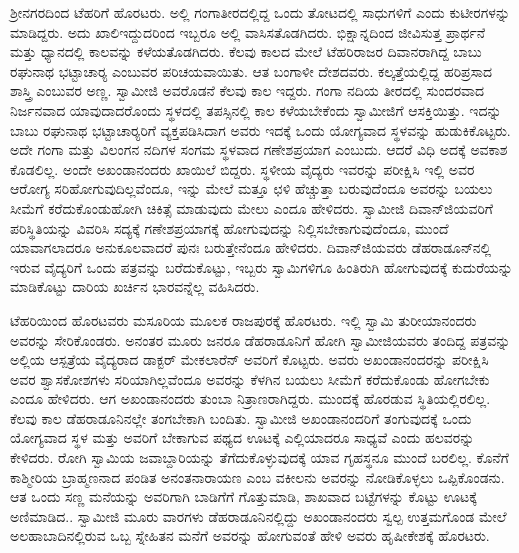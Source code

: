ಶ‍್ರೀನಗರದಿಂದ ಟೆಹರಿಗೆ ಹೊರಟರು. ಅಲ್ಲಿ ಗಂಗಾತೀರದಲ್ಲಿದ್ದ ಒಂದು ತೋಟದಲ್ಲಿ ಸಾಧುಗಳಿಗೆ ಎಂದು ಕುಟೀರಗಳನ್ನು ಮಾಡಿದ್ದರು. ಅದು ಖಾಲಿ\break ಇದ್ದುದರಿಂದ ಇಬ್ಬರೂ ಅಲ್ಲಿ ವಾಸಿಸತೊಡಗಿದರು. ಭಿಕ್ಷಾನ್ನದಿಂದ ಜೀವಿಸುತ್ತ ಪ್ರಾರ್ಥನೆ ಮತ್ತು ಧ್ಯಾನದಲ್ಲಿ ಕಾಲವನ್ನು ಕಳೆಯತೊಡಗಿದರು. ಕೆಲವು ಕಾಲದ ಮೇಲೆ ಟೆಹರಿರಾಜರ ದಿವಾನರಾಗಿದ್ದ ಬಾಬು ರಘುನಾಥ ಭಟ್ಟಾಚಾರ‍್ಯ ಎಂಬುವರ ಪರಿಚಯವಾಯಿತು. ಆತ ಬಂಗಾಳೀ ದೇಶದವರು. ಕಲ್ಕತ್ತೆಯಲ್ಲಿದ್ದ ಹರಿಪ್ರಸಾದ ಶಾಸ್ತ್ರಿ ಎಂಬುವರ ಅಣ್ಣ. ಸ್ವಾಮೀಜಿ ಅವರೊಡನೆ ಕೆಲವು ಕಾಲ ಇದ್ದರು. ಗಂಗಾ ನದಿಯ ತೀರದಲ್ಲಿ ಸುಂದರವಾದ ನಿರ್ಜನವಾದ ಯಾವುದಾದರೊಂದು ಸ್ಥಳದಲ್ಲಿ ತಪಸ್ಸಿನಲ್ಲಿ ಕಾಲ ಕಳೆಯಬೇಕೆಂದು ಸ್ವಾಮೀಜಿಗೆ ಆಸಕ್ತಿಯಿತ್ತು. ಇದನ್ನು ಬಾಬು ರಘುನಾಥ ಭಟ್ಟಾಚಾರ‍್ಯರಿಗೆ ವ್ಯಕ್ತಪಡಿಸಿದಾಗ ಅವರು ಇದಕ್ಕೆ ಒಂದು ಯೋಗ್ಯವಾದ ಸ್ಥಳವನ್ನು ಹುಡುಕಿಕೊಟ್ಟರು. ಅದೇ ಗಂಗಾ ಮತ್ತು ವಿಲಂಗನ ನದಿಗಳ ಸಂಗಮ ಸ್ಥಳವಾದ ಗಣೇಶಪ್ರಯಾಗ ಎಂಬುದು. ಆದರೆ ವಿಧಿ ಅದಕ್ಕೆ ಅವಕಾಶ ಕೊಡಲಿಲ್ಲ. ಅಂದೇ ಅಖಂಡಾನಂದರು ಖಾಯಿಲೆ ಬಿದ್ದರು. ಸ್ಥಳೀಯ ವೈದ್ಯರು ಇವರನ್ನು ಪರೀಕ್ಷಿಸಿ ಇಲ್ಲಿ ಅವರ ಆರೋಗ್ಯ ಸರಿಹೋಗುವುದಿಲ್ಲವೆಂದೂ, ಇನ್ನು ಮೇಲೆ ಮತ್ತೂ ಛಳಿ ಹೆಚ್ಚುತ್ತಾ ಬರುವುದೆಂದೂ ಅವರನ್ನು ಬಯಲು ಸೀಮೆಗೆ ಕರೆದುಕೊಂಡುಹೋಗಿ ಚಿಕಿತ್ಸೆ ಮಾಡುವುದು ಮೇಲು ಎಂದೂ ಹೇಳಿದರು. ಸ್ವಾಮೀಜಿ ದಿವಾನ್‍ಜಿಯವರಿಗೆ ಪರಿಸ್ಥಿತಿಯನ್ನು ವಿವರಿಸಿ ಸದ್ಯಕ್ಕೆ ಗಣೇಶಪ್ರಯಾಗಕ್ಕೆ ಹೋಗುವುದನ್ನು ನಿಲ್ಲಿಸಬೇಕಾಗುವುದೆಂದೂ, ಮುಂದೆ ಯಾವಾಗಲಾದರೂ ಅನುಕೂಲವಾದರೆ ಪುನಃ ಬರುತ್ತೇನೆಂದೂ ಹೇಳಿದರು. ದಿವಾನ್‍ಜಿಯವರು ಡೆಹರಾಡೂನ್‍ನಲ್ಲಿ ಇರುವ ವೈದ್ಯರಿಗೆ ಒಂದು ಪತ್ರವನ್ನು ಬರೆದುಕೊಟ್ಟು, ಇಬ್ಬರು ಸ್ವಾಮಿಗಳಿಗೂ ಹಿಂತಿರುಗಿ ಹೋಗುವುದಕ್ಕೆ ಕುದುರೆಯನ್ನು ಮಾಡಿಕೊಟ್ಟು ದಾರಿಯ ಖರ್ಚಿನ ಭಾರವನ್ನೆಲ್ಲ ವಹಿಸಿದರು. 

ಟೆಹರಿಯಿಂದ ಹೊರಟವರು ಮಸೂರಿಯ ಮೂಲಕ ರಾಜಪುರಕ್ಕೆ ಹೊರಟರು. ಇಲ್ಲಿ ಸ್ವಾಮಿ ತುರೀಯಾನಂದರು ಅವರನ್ನು ಸೇರಿಕೊಂಡರು. ಅನಂತರ ಮೂರು ಜನರೂ ಡೆಹರಾಡೂನಿಗೆ ಹೋಗಿ ಸ್ವಾಮೀಜಿಯವರು ತಂದಿದ್ದ ಪತ್ರವನ್ನು ಅಲ್ಲಿಯ ಆಸ್ಪತ್ರೆಯ ವೈದ್ಯರಾದ ಡಾಕ್ಟರ್ ಮೇಕಲಾರೆನ್ ಅವರಿಗೆ ಕೊಟ್ಟರು. ಅವರು ಅಖಂಡಾನಂದರನ್ನು ಪರೀಕ್ಷಿಸಿ ಅವರ ಶ್ವಾಸಕೋಶಗಳು ಸರಿಯಾಗಿಲ್ಲವೆಂದೂ ಅವರನ್ನು ಕೆಳಗಿನ ಬಯಲು ಸೀಮೆಗೆ ಕರೆದುಕೊಂಡು ಹೋಗಬೇಕು ಎಂದೂ ಹೇಳಿದರು. ಆಗ ಅಖಂಡಾನಂದರು ತುಂಬಾ ನಿತ್ರಾಣರಾಗಿದ್ದರು. ಮುಂದಕ್ಕೆ ಹೊರಡುವ ಸ್ಥಿತಿಯಲ್ಲಿರಲಿಲ್ಲ. ಕೆಲವು ಕಾಲ ಡೆಹರಾಡೂನಿನಲ್ಲೇ ತಂಗಬೇಕಾಗಿ ಬಂದಿತು. ಸ್ವಾಮೀಜಿ ಅಖಂಡಾನಂದರಿಗೆ ತಂಗುವುದಕ್ಕೆ ಒಂದು ಯೋಗ್ಯವಾದ ಸ್ಥಳ ಮತ್ತು ಅವರಿಗೆ ಬೇಕಾಗುವ ಪಥ್ಯದ ಊಟಕ್ಕೆ ಎಲ್ಲಿಯಾದರೂ ಸಾಧ್ಯವೆ ಎಂದು ಹಲವರನ್ನು ಕೇಳಿದರು. ರೋಗಿ ಸ್ವಾಮಿಯ ಜವಾಬ್ದಾರಿಯನ್ನು ತೆಗೆದುಕೊಳ್ಳುವುದಕ್ಕೆ ಯಾವ ಗೃಹಸ್ಥನೂ ಮುಂದೆ ಬರಲಿಲ್ಲ. ಕೊನೆಗೆ ಕಾಶ್ಮೀರಿಯ ಬ್ರಾಹ್ಮಣನಾದ ಪಂಡಿತ ಅನಂತನಾರಾಯಣ ಎಂಬ ವಕೀಲನು ಅವರನ್ನು ನೋಡಿಕೊಳ್ಳಲು ಒಪ್ಪಿಕೊಂಡನು. ಆತ ಒಂದು ಸಣ್ಣ ಮನೆಯನ್ನು ಅವರಿಗಾಗಿ ಬಾಡಿಗೆಗೆ ಗೊತ್ತುಮಾಡಿ, ಶಾಖವಾದ ಬಟ್ಟೆಗಳನ್ನು ಕೊಟ್ಟು ಊಟಕ್ಕೆ ಅಣಿಮಾಡಿದ.. ಸ್ವಾಮೀಜಿ ಮೂರು ವಾರಗಳು ಡೆಹರಾಡೂನಿನಲ್ಲಿದ್ದು ಅಖಂಡಾನಂದರು ಸ್ವಲ್ಪ ಉತ್ತಮಗೊಂಡ ಮೇಲೆ ಅಲಹಾಬಾದಿನಲ್ಲಿರುವ ಒಬ್ಬ ಸ್ನೇಹಿತನ ಮನೆಗೆ ಅವರನ್ನು ಹೋಗುವಂತೆ ಹೇಳಿ ಅವರು ಹೃಷೀಕೇಶಕ್ಕೆ ಹೊರಟರು. 

